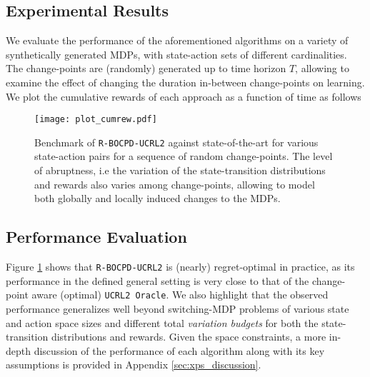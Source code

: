 \documentclass{article} %
\begin{document}

\subsection{Experimental Results}
We evaluate the performance of the aforementioned algorithms on a variety of synthetically generated MDPs, with state-action sets of different cardinalities. The change-points are (randomly) generated up to time horizon $T$, allowing to examine the effect of changing the duration in-between change-points on learning. We plot the cumulative rewards of each approach as a function of time as follows

\begin{figure}[H]
    \vspace{-1.2cm}
    \hspace*{-2.25cm}   
    \texttt{[image: plot\_cumrew.pdf]}
    \vspace{-1.7cm}
    \caption{Benchmark of \texttt{R-BOCPD-UCRL2} against state-of-the-art for various state-action pairs for a sequence of random change-points. The level of abruptness, i.e the variation of the state-transition distributions and rewards also varies among change-points, allowing to model both globally and locally induced changes to the MDPs.}
    \label{fig:benchmark}
\end{figure}
\vspace{-.5cm}
\subsection{Performance Evaluation}
Figure \ref{fig:benchmark} shows that \texttt{R-BOCPD-UCRL2} is (nearly) regret-optimal in practice, as its performance in the defined general setting is very close to that of the change-point aware (optimal) \texttt{UCRL2 Oracle}. We also highlight that the observed performance generalizes well beyond switching-MDP problems of various state and action space sizes and different total \textit{variation budgets} for both the state-transition distributions and rewards. Given the space constraints, a more in-depth discussion of the performance of each algorithm along with its key assumptions is provided in Appendix \ref{sec:xps_discussion}. 
\end{document}
